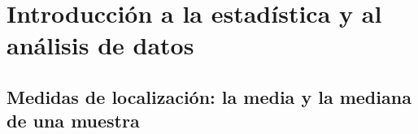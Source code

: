\chapter{Introducción a la estadística y al análisis de datos}
\section{Medidas de localización: la media y la mediana de una muestra}
